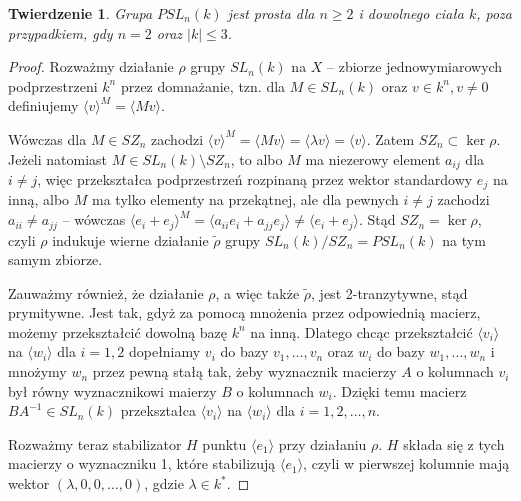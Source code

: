 \documentclass[licencjacka]{pracamgr}
\newtheorem{thh}{Twierdzenie}[section]
\begin{document}
\begin{thh}\label{PSL_simplicy}
  Grupa $PSL_n(k)$ jest prosta dla $n \ge 2$ i dowolnego ciała $k$, poza przypadkiem, gdy $n = 2$ oraz $|k| \le 3$.
\end{thh}
\begin{proof}
  Rozważmy działanie $\rho$ grupy $SL_n(k)$ na $X$ -- zbiorze jednowymiarowych podprzestrzeni $k^n$ przez domnażanie,
  tzn. dla $M \in SL_n(k)$ oraz $v \in k^n, v \ne 0$ definiujemy $\langle v \rangle ^ M = \langle Mv \rangle$.
  
  Wówczas dla $M \in SZ_n$ zachodzi $\langle v \rangle ^ M = \langle M v \rangle = \langle \lambda v \rangle = \langle v \rangle$.
  Zatem $SZ_n \subset \ker \rho$. Jeżeli natomiast $M \in SL_n(k) \setminus SZ_n$, to albo $M$ ma niezerowy element $a_{i j}$ dla $i \ne j$, 
  więc przekształca podprzestrzeń rozpinaną przez wektor standardowy $e_j$ na inną, albo $M$ ma tylko elementy na przekątnej, 
  ale dla pewnych $i \ne j$ zachodzi $a_{i i} \ne a_{j j}$ -- wówczas $\langle e_i + e_j \rangle^M = \langle a_{i i} e_i + a_{j j} e_j \rangle \ne \langle  e_i + e_j \rangle$.
  Stąd $SZ_n = \ker \rho$, czyli $\rho$ indukuje wierne działanie $\tilde{\rho}$ grupy $SL_n(k) / SZ_n = PSL_n(k)$ na tym samym zbiorze.

  Zauważmy również, że działanie $\rho$, a więc także $\tilde{\rho}$, jest 2-tranzytywne, stąd prymitywne.
  Jest tak, gdyż za pomocą mnożenia przez odpowiednią macierz, możemy przekształcić dowolną bazę $k^n$ na inną.
  Dlatego chcąc przekształcić $\langle v_i \rangle$ na $\langle w_i \rangle$ dla $i = 1, 2$ dopełniamy $v_i$ do bazy $v_1, \ldots, v_n$
  oraz $w_i$ do bazy $w_1, \ldots, w_n$ i mnożymy $w_n$ przez pewną stałą tak, żeby wyznacznik macierzy $A$ o kolumnach $v_i$ 
  był równy wyznacznikowi maierzy $B$ o kolumnach $w_i$. 
  Dzięki temu macierz $B A^{-1} \in SL_n(k)$ przekształca $\langle v_i \rangle$ na $\langle w_i \rangle$ dla $i = 1, 2, \ldots, n$.

  Rozważmy teraz stabilizator $H$ punktu $\langle e_1 \rangle$ przy działaniu $\rho$.
  $H$ składa się z tych macierzy o wyznaczniku 1, które stabilizują $\langle e_1 \rangle$,
  czyli w pierwszej kolumnie mają wektor $(\lambda, 0, 0, \ldots, 0)$, gdzie $\lambda \in k^*$.


\end{proof}
\end{document}
